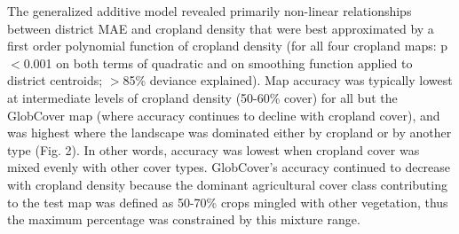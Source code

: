 \documentclass[12 pt, titlepage, a4paper]{article}
\begin{document}

The generalized additive model revealed primarily non-linear relationships between district MAE and cropland density that were best approximated by a first order polynomial function of cropland density (for all four cropland maps: p$<$0.001 on both terms of quadratic and on smoothing function applied to district centroids; $>$85\% deviance explained). Map accuracy was typically lowest at intermediate levels of cropland density (50-60\% cover) for all but the GlobCover map (where accuracy continues to decline with cropland cover), and was highest where the landscape was dominated either by cropland or by another type (Fig. 2). In other words, accuracy was lowest when cropland cover was mixed evenly with other cover types. GlobCover's accuracy continued to decrease with cropland density because the dominant agricultural cover class contributing to the test map was defined as 50-70\% crops mingled with other vegetation, thus the maximum percentage was constrained by this mixture range.  

\end{document}
